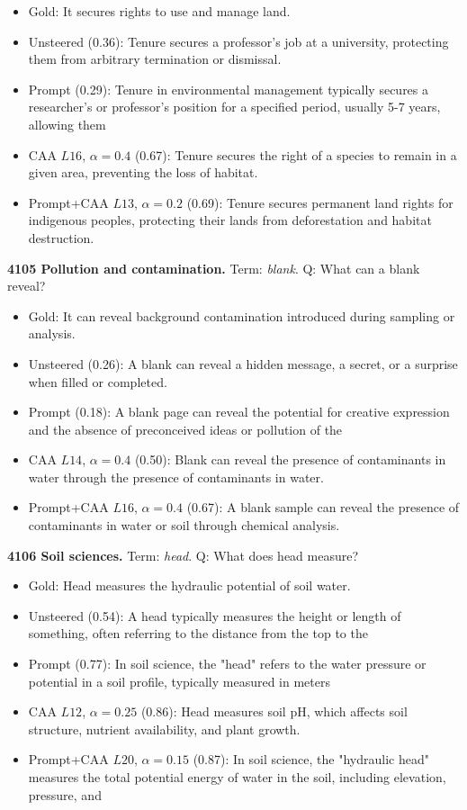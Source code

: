 \begin{itemize}\setlength{\itemsep}{0.15em}\setlength{\parsep}{0pt}\setlength{\topsep}{0.2em}
\item Gold: It secures rights to use and manage land.
\item Unsteered (0.36): Tenure secures a professor's job at a university, protecting them from arbitrary termination or dismissal.
\item Prompt (0.29): Tenure in environmental management typically secures a researcher's or professor's position for a specified period, usually 5-7 years, allowing them
\item CAA $L16$, $\alpha=0.4$ (0.67): Tenure secures the right of a species to remain in a given area, preventing the loss of habitat.
\item Prompt+CAA $L13$, $\alpha=0.2$ (0.69): Tenure secures permanent land rights for indigenous peoples, protecting their lands from deforestation and habitat destruction.
\end{itemize}
\medskip\noindent\textbf{4105 Pollution and contamination.} Term: \emph{blank}.
Q: What can a blank reveal?
\begin{itemize}\setlength{\itemsep}{0.15em}\setlength{\parsep}{0pt}\setlength{\topsep}{0.2em}
\item Gold: It can reveal background contamination introduced during sampling or analysis.
\item Unsteered (0.26): A blank can reveal a hidden message, a secret, or a surprise when filled or completed.
\item Prompt (0.18): A blank page can reveal the potential for creative expression and the absence of preconceived ideas or pollution of the
\item CAA $L14$, $\alpha=0.4$ (0.50): Blank can reveal the presence of contaminants in water through the presence of contaminants in water.
\item Prompt+CAA $L16$, $\alpha=0.4$ (0.67): A blank sample can reveal the presence of contaminants in water or soil through chemical analysis.
\end{itemize}
\medskip\noindent\textbf{4106 Soil sciences.} Term: \emph{head}.
Q: What does head measure?
\begin{itemize}\setlength{\itemsep}{0.15em}\setlength{\parsep}{0pt}\setlength{\topsep}{0.2em}
\item Gold: Head measures the hydraulic potential of soil water.
\item Unsteered (0.54): A head typically measures the height or length of something, often referring to the distance from the top to the
\item Prompt (0.77): In soil science, the "head" refers to the water pressure or potential in a soil profile, typically measured in meters
\item CAA $L12$, $\alpha=0.25$ (0.86): Head measures soil pH, which affects soil structure, nutrient availability, and plant growth.
\item Prompt+CAA $L20$, $\alpha=0.15$ (0.87): In soil science, the "hydraulic head" measures the total potential energy of water in the soil, including elevation, pressure, and
\end{itemize}
